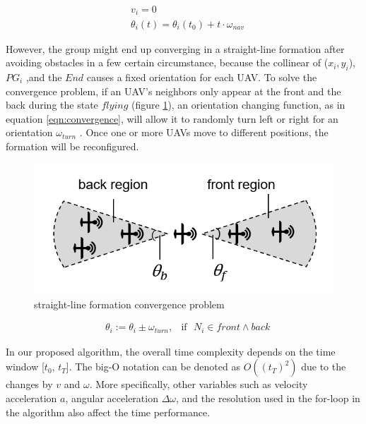 \begin{equation}
\begin{aligned}
& v_{i} = 0 \\
& \theta_{i}(t) = \theta_{i}(t_{0}) + t \cdot \omega_{nav}
\end{aligned}
\end{equation}

However, the group might end up converging in a straight-line formation after avoiding obstacles in a few certain circumstance, because the collinear of ($x_{i}, y_{i}$), $PG_{i}$ ,and the $End$ causes a fixed orientation for each UAV. To solve the convergence problem, if an UAV's neighbors only appear at the front and the back during the state $flying$ (figure \ref{fig:convergence}), an orientation changing function, as in equation \ref{eqn:convergence}, will allow it to randomly turn left or right for an orientation $\omega_{turn}$ . Once one or more UAVs move to different positions, the formation will be reconfigured.

\begin{figure}[H]
    \centering
    \includegraphics[scale=0.8]{figures/line-convergence.png}
    \caption{straight-line formation convergence problem}
    \label{fig:convergence}
\end{figure}

\begin{equation}
\begin{aligned}
& \theta_{i} := \theta_{i} \pm \omega_{turn}, &\mbox{if} \mbox{ }  N_{i} \in front \land back
\label{eqn:convergence}
\end{aligned}
\end{equation}




In our proposed algorithm, the overall time complexity depends on the time window [$t_{0}$, $t_{T}$]. The big-O notation can be denoted as $O((t_{T})^2)$ due to the changes by $v$ and $\omega$. More specifically, other variables such as velocity acceleration $a$, angular acceleration $\Delta\omega$, and the resolution used in the for-loop in the algorithm also affect the time performance.






